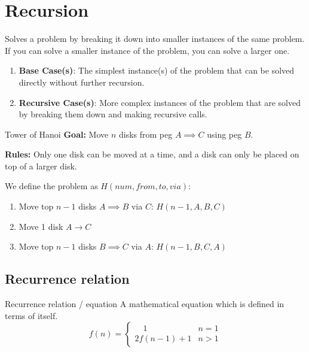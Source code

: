 \section{Recursion}

Solves a problem by breaking it down into smaller instances of the same problem. If you can solve a smaller instance of the problem, you can solve a larger one.

\begin{enumerate}
    \item \textbf{Base Case(s)}: The simplest instance(s) of the problem that can be solved directly without further recursion.
    \item \textbf{Recursive Case(s)}: More complex instances of the problem that are solved by breaking them down and making recursive calls.
\end{enumerate}

\begin{knBox}
    {Tower of Hanoi}
    \textbf{Goal: }Move $n$ disks from peg $A \implies C$ using peg $B$.

    \textbf{Rules: }Only one disk can be moved at a time, and a disk can only be placed on top of a larger disk.

    We define the problem as $H(num, from, to, via)$:
    \begin{enumerate}
        \item Move top $n-1$ disks $A \implies B$ via $C$: $H(n-1, A, B, C)$
        \item Move 1 disk $A \to C$
        \item Move top $n-1$ disks $B \implies C$ via $A$: $H(n-1, B, C, A)$
    \end{enumerate}
\end{knBox}

\subsection{Recurrence relation}

\begin{definition}
    {Recurrence relation / equation}
    A mathematical equation which is defined in terms of itself.
    \[f(n)=\begin{cases}\quad1&n=1\\2f(n-1)+1&n>1\end{cases}\]
\end{definition}


